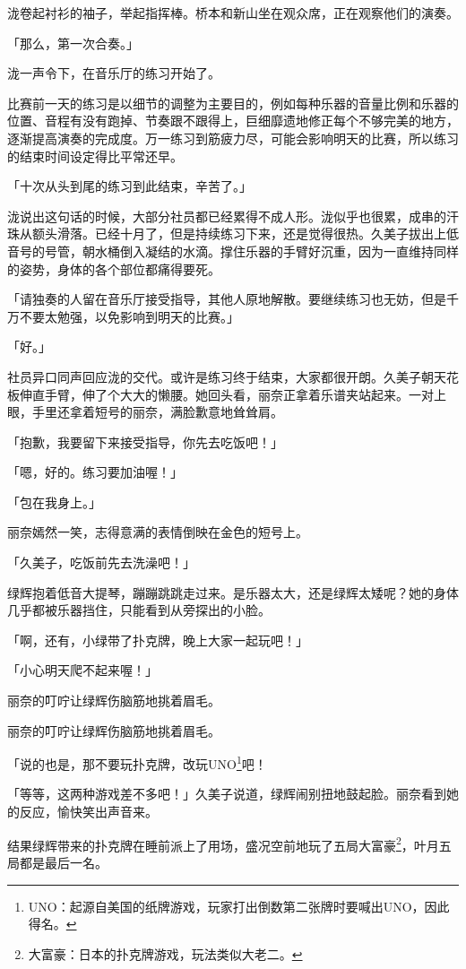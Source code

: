 \documentclass[UTF8]{ctexart}
\begin{document}
    泷卷起衬衫的袖子，举起指挥棒。桥本和新山坐在观众席，正在观察他们的演奏。 

    「那么，第一次合奏。」 

    泷一声令下，在音乐厅的练习开始了。 

    比赛前一天的练习是以细节的调整为主要目的，例如每种乐器的音量比例和乐器的位置、音程有没有跑掉、节奏跟不跟得上，巨细靡遗地修正每个不够完美的地方，逐渐提高演奏的完成度。万一练习到筋疲力尽，可能会影响明天的比赛，所以练习的结束时间设定得比平常还早。 

    「十次从头到尾的练习到此结束，辛苦了。」 

    泷说出这句话的时候，大部分社员都已经累得不成人形。泷似乎也很累，成串的汗珠从额头滑落。已经十月了，但是持续练习下来，还是觉得很热。久美子拔出上低音号的号管，朝水桶倒入凝结的水滴。撑住乐器的手臂好沉重，因为一直维持同样的姿势，身体的各个部位都痛得要死。 

    「请独奏的人留在音乐厅接受指导，其他人原地解散。要继续练习也无妨，但是千万不要太勉强，以免影响到明天的比赛。」 

    「好。」 

    社员异口同声回应泷的交代。或许是练习终于结束，大家都很开朗。久美子朝天花板伸直手臂，伸了个大大的懒腰。她回头看，丽奈正拿着乐谱夹站起来。一对上眼，手里还拿着短号的丽奈，满脸歉意地耸耸肩。 

    「抱歉，我要留下来接受指导，你先去吃饭吧！」 

    「嗯，好的。练习要加油喔！」 

    「包在我身上。」 

    丽奈嫣然一笑，志得意满的表情倒映在金色的短号上。 

    「久美子，吃饭前先去洗澡吧！」 

    绿辉抱着低音大提琴，蹦蹦跳跳走过来。是乐器太大，还是绿辉太矮呢？她的身体几乎都被乐器挡住，只能看到从旁探出的小脸。 

    「啊，还有，小绿带了扑克牌，晚上大家一起玩吧！」 

    「小心明天爬不起来喔！」 

    丽奈的叮咛让绿辉伤脑筋地挑着眉毛。 

    丽奈的叮咛让绿辉伤脑筋地挑着眉毛。
    
    「说的也是，那不要玩扑克牌，改玩UNO\footnote{UNO：起源自美国的纸牌游戏，玩家打出倒数第二张牌时要喊出UNO，因此得名。}吧！

    「等等，这两种游戏差不多吧！」久美子说道，绿辉闹别扭地鼓起脸。丽奈看到她的反应，愉快笑出声音来。 

    结果绿辉带来的扑克牌在睡前派上了用场，盛况空前地玩了五局大富豪\footnote{大富豪：日本的扑克牌游戏，玩法类似大老二。}，叶月五局都是最后一名。
\end{document}
